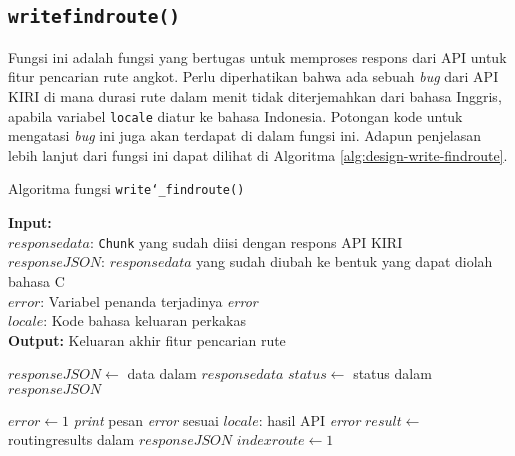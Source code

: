 \subsection{\texttt{write\textunderscore findroute()}}
\label{sec:design-code-write-findroute}

Fungsi ini adalah fungsi yang bertugas untuk memproses respons dari API untuk fitur pencarian rute angkot. Perlu diperhatikan bahwa ada sebuah \textit{bug} dari API KIRI di mana durasi rute dalam menit tidak diterjemahkan dari bahasa Inggris, apabila variabel \verb|locale| diatur ke bahasa Indonesia. Potongan kode untuk mengatasi \textit{bug} ini juga akan terdapat di dalam fungsi ini. Adapun penjelasan lebih lanjut dari fungsi ini dapat dilihat di Algoritma \ref{alg:design-write-findroute}.

\begin{algorithm}[h]
	\caption{\textendash\xspace Algoritma fungsi \texttt{write\char`_findroute()}}
	\label{alg:design-write-findroute}
	\vspace{-0.6\baselineskip}
	\begin{flushleft}
		\textbf{Input:} \\
		\hspace{1.1em}\textendash\xspace $responsedata$: \texttt{Chunk} yang sudah diisi dengan respons API KIRI \\
		\hspace{1.1em}\textendash\xspace $responseJSON$: $responsedata$ yang sudah diubah ke bentuk yang dapat diolah bahasa C \\
		\hspace{1.1em}\textendash\xspace $error$: Variabel penanda terjadinya \textit{error} \\
		\hspace{1.1em}\textendash\xspace $locale$: Kode bahasa keluaran perkakas \\
		\textbf{Output:} Keluaran akhir fitur pencarian rute \\
	\end{flushleft}
	\vspace{-1.05\baselineskip}
	\begin{algorithmic}
		\State $responseJSON \gets$ data dalam $responsedata$
		\State $status \gets$ \textquotesingle\textquotesingle status\textquotesingle\textquotesingle\xspace dalam $responseJSON$
		
			\State $error \gets 1$
			\State \textit{print} pesan \textit{error} sesuai $locale$: hasil API \textit{error}
		\Else
			\State $result \gets$ \textquotesingle\textquotesingle routingresults\textquotesingle\textquotesingle\xspace dalam $responseJSON$
			\State $indexroute \gets 1$
			

\end{algorithmic}
\end{algorithm}
